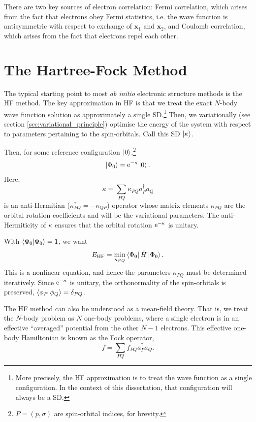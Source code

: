 There are two key sources of electron correlation: Fermi correlation, which arises from the fact that electrons obey Fermi statistics, i.e. the wave function is antisymmetric with respect to exchange of $\bm x_1$ and $\bm x_2$, and Coulomb correlation, which arises from the fact that electrons repel each other.

\section{The Hartree-Fock Method}
\label{sec:hf}

The typical starting point to most \emph{ab initio} electronic structure methods is the \gls{HF} method.\cite{hartreeWave1928,fockNaherungsmethode1930,slaterNote1930} The key approximation in \gls{HF} is that we treat the exact $N$-body wave function solution as approximately a single \gls{SD}.\footnote{More precisely, the \gls{HF} approximation is to treat the wave function as a single configuration. In the context of this dissertation, that configuration will always be a \gls{SD}.} Then, we variationally (see section \ref{sec:variational_principle}) optimise the energy of the system with respect to parameters pertaining to the spin-orbitals. Call this \gls{SD} $\ket{\kappa}$.

Then, for some reference configuration $\ket 0$,\footnote{$P=(p,\sigma)$ are spin-orbital indices, for brevity.}
\begin{equation}
\ket{\Phi_0} = \mathrm{e}^{-\kappa} \ket 0.
\end{equation}
Here,
\begin{equation}
\kappa = \sum_{PQ} \kappa_{PQ}a_P^\dag a_Q
\end{equation}
is an anti-Hermitian ($\kappa_{PQ}^* = -\kappa_{QP}$) operator whose matrix elements $\kappa_{PQ}$ are the orbital rotation coefficients and will be the variational parameters. The anti-Hermiticity of $\kappa$ ensures that the orbital rotation $\mathrm{e}^{-\kappa}$ is unitary.

With $\braket{\Phi_0}=1$, we want
\begin{equation}
E_\mathrm{HF} = \min_{\kappa_{PQ}}\bra{\Phi_0}\hat H\ket{\Phi_0}.
\end{equation}
This is a nonlinear equation, and hence the parameters $\kappa_{PQ}$ must be determined iteratively. Since $\mathrm{e}^{-\kappa}$ is unitary, the orthonormality of the spin-orbitals is preserved, $\bra{\phi_P}\ket{\phi_Q} = \delta_{PQ}$.

The \gls{HF} method can also be understood as a mean-field theory. That is, we treat the $N$-body problem as $N$ one-body problems, where a single electron is in an effective ``averaged'' potential from the other $N-1$ electrons. This effective one-body Hamiltonian is known as the Fock operator,
\begin{equation}
    \label{eq:fock-operator}
    f = \sum_{PQ} f_{PQ} a_P^\dag a_Q.
\end{equation}

